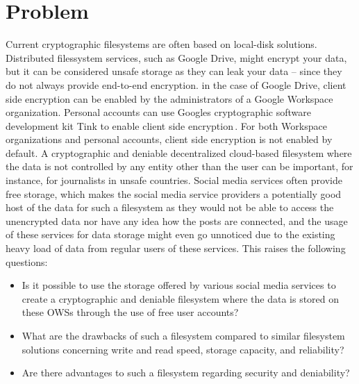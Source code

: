 
\section{Problem}
\label{sec:problem}

Current cryptographic filesystems are often based on \mbox{local-disk} solutions. Distributed filessystem services, such as Google Drive, might encrypt your data, but it can be considered unsafe storage as they can leak your data -- since they do not always provide \mbox{end-to-end} encryption. in the case of Google Drive, client side encryption can be enabled by the administrators of a Google Workspace organization. Personal accounts can use Googles cryptographic software development kit Tink to enable client side encryption\,\cite{googleClientsideEncryptionKeys2023}. For both Workspace organizations and personal accounts, client side encryption is not enabled by default. A cryptographic and deniable decentralized \mbox{cloud-based} filesystem where the data is not controlled by any entity other than the user can be important, for instance, for journalists in unsafe countries. Social media services often provide free storage, which makes the social media service providers a potentially good host of the data for such a filesystem as they would not be able to access the unencrypted data nor have any idea how the posts are connected, and the usage of these services for data storage might even go unnoticed due to the existing heavy load of data from regular users of these services. This raises the following questions:
\begin{itemize}
    \item Is it possible to use the storage offered by various social media services to create a cryptographic and deniable filesystem where the data is stored on these \glspl{OWS} through the use of free user accounts? 
    
    \item What are the drawbacks of such a filesystem compared to similar filesystem solutions concerning write and read speed, storage capacity, and reliability?
    
    \item Are there advantages to such a filesystem regarding security and deniability? 
\end{itemize}


